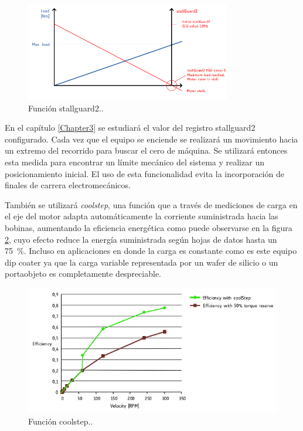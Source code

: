 \begin{figure}[h]
\centering 
\includegraphics[width=0.8\textwidth]{./Figures/tmc5130_stallguard2.png}
\caption{Función stallguard2.\protect\footnotemark.}
\label{fig:tmc5130_stallGuard2}
\end{figure}


En el capítulo \ref{Chapter3} se estudiará el valor del registro  stallguard2 configurado. Cada vez que el equipo se enciende se realizará un movimiento hacia un extremo del recorrido para buscar el cero de máquina. Se utilizará entonces esta medida para encontrar un límite mecánico del sistema y realizar  un posicionamiento inicial. El uso de esta funcionalidad evita la incorporación de finales de carrera electromecánicos.   


También se utilizará \textit{coolstep}, una función que a través de mediciones de carga en el eje del motor adapta automáticamente la corriente suministrada hacia las bobinas, aumentando la eficiencia energética como puede observarse en la figura \ref{fig:tmc5130_coolStep}, cuyo efecto reduce la energía suministrada según hojas de datos \citep{3_web_trinamic_producto} hasta un \SI{75}{\percent}. Incluso en aplicaciones en donde la carga es constante como es este equipo dip coater ya que la carga variable representada por un wafer de silicio o un portaobjeto es completamente despreciable.

\begin{figure}[h]
\centering 
\includegraphics[width=1\textwidth]{./Figures/tmc5130_coolstep.png}
\caption{Función coolstep.\protect\footnotemark.}
\label{fig:tmc5130_coolStep}
\end{figure}

